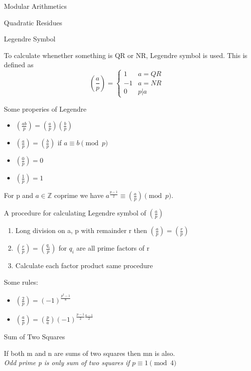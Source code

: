 \documentclass[12pt, letterpaper]{article}
\begin{document}
\begin{section}{Modular Arithmetics}
\begin{subsection}{Quadratic Residues}
    \begin{subsubsection}{Legendre Symbol}

      To calculate  whenether something is QR or NR, Legendre symbol is used.
      This is defined as
      \[(\frac{a}{p}) =
        \begin{cases}
          1 & a = QR \\
          -1 & a = NR \\
          0 & p | a
        \end{cases}
      \]

      Some properies of Legendre
      \begin{itemize}
        \item \((\frac{ab}{p}) = (\frac{a}{p})(\frac{b}{p})\)
        \item \((\frac{a}{p}) = (\frac{b}{p})\) if \(a \equiv b \pmod{p}\)
        \item \((\frac{0}{p}) = 0\)
        \item \((\frac{1}{p}) = 1\)
      \end{itemize}

      For p and \(a \in \mathbb{Z}\) coprime we have
      \(a^{\frac{p - 1}{2}} \equiv (\frac{a}{p}) \pmod{p}\).

      A procedure for calculating Legendre symbol of \((\frac{a}{p})\)
      \begin{enumerate}
        \item Long division on a, p with remainder r then \((\frac{a}{p}) = (\frac{r}{p})\)
        \item \((\frac{r}{p}) = (\frac{q_{i}}{p})\) for \(q_{i}\) are all prime factors of r
        \item Calculate each factor product same procedure
      \end{enumerate}

      Some rules:
      \begin{itemize}
        \item \((\frac{2}{p}) = (-1)^{\frac{p^{2} - 1}{8}}\)
        \item \((\frac{a}{p}) = (\frac{p}{a})(-1)^{\frac{p - 1}{2} \frac{a - 1}{2}}\)
      \end{itemize}
      
    \end{subsubsection}

  \end{subsection}

  \begin{subsection}{Sum of Two Squares}

    If both m and n are  sums of two squares then mn is also. \\
    \emph{Odd prime p is only sum of two squares if \(p \equiv 1 \pmod{4}\)}

  \end{subsection}

\end{section}
\end{document}
